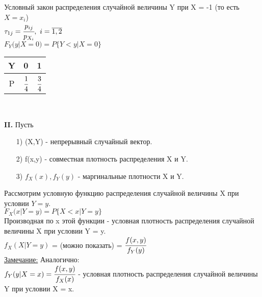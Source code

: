 \begin{enumerate}
	Условный закон распределения случайной величины Y при X = -1 (то есть $X = x_i$)\\
	$\tau_{1j} = \cfrac{p_{ij}}{p_{X_i}}, \ i = \overline{1,2}$\\
	$F_Y(y|X = 0) = P\{Y < y|X = 0\}$\\
	
	\begin{tabular}{|c||c|c|}
	\hline 
	Y & 0 & 1 \\ 
	\hline 
	P & $\cfrac{1}{4}$ & $\cfrac{3}{4}$ \\ 
	\hline 
	\end{tabular}  \\
	
\end{enumerate}


\textbf{II.} Пусть
\begin{enumerate}
	\item[1)] (X,Y) - непрерывный случайный вектор.
	
	\item[2)] f(x,y) - совместная плотность распределения X и Y.
	
	\item[3)] $f_X(x), f_Y(y)$ - маргинальные плотности X и Y.
\end{enumerate}
Рассмотрим условную функцию распределения случайной величины X при условии $Y = y$.\\
$F_X(x|Y = y) = P\{X < x|Y = y\}$\\
Производная по x этой функции - условная плотность распределения случайной величины X при условии Y = y.\\
$f_X(X|Y = y)$ = (можно показать) = $\cfrac{f(x,y)}{f_Y(y)}$\\
\underline{Замечание:} Аналогично:\\
$f_Y(y|X = x) = \cfrac{f(x,y)}{f_X(x)}$ - условная плотность распределения случайной величины Y при условии X = x.\\


